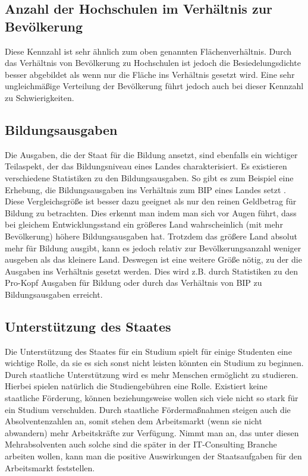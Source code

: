 \subsection*{Anzahl der Hochschulen im Verhältnis zur Bevölkerung}
Diese Kennzahl ist sehr ähnlich zum oben genannten Flächenverhältnis. Durch das Verhältnis von Bevölkerung zu Hochschulen ist jedoch die Besiedelungsdichte besser abgebildet als wenn nur die Fläche ins Verhältnis gesetzt wird.
Eine sehr ungleichmäßige Verteilung der Bevölkerung führt jedoch auch bei dieser Kennzahl zu Schwierigkeiten.

\subsection*{Bildungsausgaben}
Die Ausgaben, die der Staat für die Bildung ansetzt, sind ebenfalls ein wichtiger Teilaspekt, der das Bildungsniveau eines Landes charakterisiert.
Es existieren verschiedene Statistiken zu den Bildungsausgaben. So gibt es zum Beispiel eine Erhebung, die Bildungsausgaben ins Verhältnis zum BIP eines Landes setzt \cite[6]{oecd2} \cite{bip}. Diese Vergleichsgröße ist besser dazu geeignet als nur den reinen Geldbetrag für Bildung zu betrachten. Dies erkennt man indem man sich vor Augen führt, dass bei gleichem Entwicklungsstand ein größeres Land wahrscheinlich (mit mehr Bevölkerung) höhere Bildungsausgaben hat. Trotzdem das größere Land absolut mehr für Bildung ausgibt, kann es jedoch relativ zur Bevölkerungsanzahl weniger ausgeben als das kleinere Land. Deswegen ist eine weitere Größe nötig, zu der die Ausgaben ins Verhältnis gesetzt werden. Dies wird z.B. durch Statistiken zu den Pro-Kopf Ausgaben für Bildung \cite[4]{oecd2} oder durch das Verhältnis von BIP zu Bildungsausgaben erreicht.

\subsection*{Unterstützung des Staates} 
Die Unterstützung des Staates für ein Studium spielt für einige Studenten eine wichtige Rolle, da sie es sich sonst nicht leisten könnten ein Studium zu beginnen. Durch staatliche Unterstützung wird es mehr Menschen ermöglicht zu studieren. Hierbei spielen natürlich die Studiengebühren eine Rolle. Existiert keine staatliche Förderung, können beziehungsweise wollen sich viele nicht so stark für ein Studium verschulden. Durch staatliche Fördermaßnahmen steigen auch die Absolventenzahlen an, somit stehen dem Arbeitsmarkt (wenn sie nicht abwandern) mehr Arbeitskräfte zur Verfügung. Nimmt man an, das unter diesen Mehrabsolventen auch solche sind die später in der IT-Consulting Branche arbeiten wollen, kann man die positive Auswirkungen der Staatsaufgaben für den Arbeitsmarkt feststellen.

